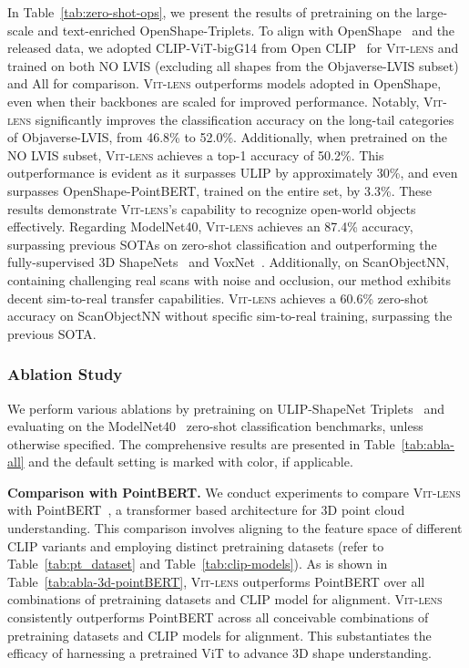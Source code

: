 \documentclass{article}
\newcommand{\clipvit}{CLIP-ViT\xspace}
\newcommand{\vit}{ViT\xspace}
\newcommand{\methodname}{{\scshape Vit-lens}\xspace}
\newcommand{\dsA}{\textcolor{myyellow}{}}
\newcommand{\dsC}{{\textcolor{mypurpledeep}{}}}
\begin{document}
In Table~\ref{tab:zero-shot-ops}, we present the results of pretraining on the large-scale and text-enriched \dsC OpenShape-Triplets. To align with OpenShape~\cite{liu2023openshape} and the released data, we adopted \clipvit-bigG14 from Open CLIP~\cite{cherti2022openclip} for \methodname and trained on both \dsC NO LVIS (excluding all shapes from the Objaverse-LVIS subset) and \dsC All for comparison. \methodname outperforms models adopted in OpenShape, even when their backbones are scaled for improved performance. 
Notably, \methodname significantly improves the classification accuracy on the long-tail categories of Objaverse-LVIS, from 46.8\% to 52.0\%. Additionally, when pretrained on the NO LVIS subset, \methodname achieves a top-1 accuracy of 50.2\%. This outperformance is evident as it surpasses ULIP by approximately 30\%, and even surpasses OpenShape-PointBERT, trained on the entire set, by 3.3\%.  These results demonstrate \methodname's capability to recognize open-world objects effectively.
Regarding ModelNet40, \methodname achieves an 87.4\% accuracy, surpassing previous SOTAs on zero-shot classification and outperforming the fully-supervised 3D ShapeNets~\cite{wu2015modelnet} and VoxNet~\cite{maturana2015voxnet}. Additionally, on ScanObjectNN, containing challenging real scans with noise and occlusion, our method exhibits decent sim-to-real transfer capabilities. \methodname achieves a 60.6\% zero-shot accuracy on ScanObjectNN without specific sim-to-real training, surpassing the previous SOTA.


\subsubsection{Ablation Study}
We perform various ablations by pretraining on \dsA ULIP-ShapeNet Triplets~\cite{xue2023ulip} and evaluating on the ModelNet40~\cite{wu2015modelnet} zero-shot classification benchmarks, unless otherwise specified. The comprehensive results are presented in Table~\ref{tab:abla-all} and the default setting is marked with \colorbox{lavenderweb}{color}, if applicable.

\textbf{Comparison with PointBERT.} We conduct experiments to compare \methodname with PointBERT~\cite{yu2022pointbert}, a transformer based architecture for 3D point cloud understanding. This comparison involves aligning to the feature space of different CLIP variants and employing distinct pretraining datasets (refer to Table~\ref{tab:pt_dataset} and Table~\ref{tab:clip-models}).
As is shown in Table~\ref{tab:abla-3d-pointBERT}, \methodname outperforms PointBERT over all combinations of pretraining datasets and CLIP model for alignment. \methodname consistently outperforms PointBERT across all conceivable combinations of pretraining datasets and CLIP models for alignment. This substantiates the efficacy of harnessing a pretrained \vit to advance 3D shape understanding.
\end{document}

